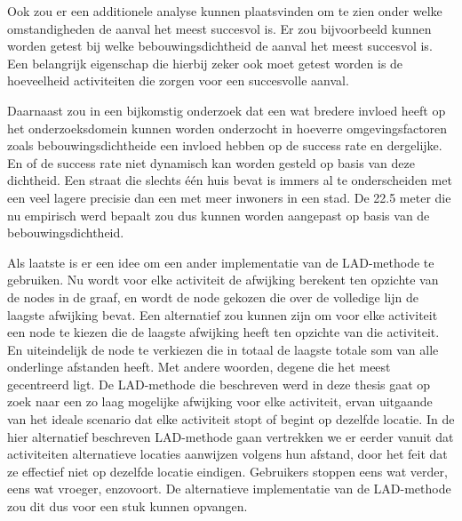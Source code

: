 Ook zou er een additionele analyse kunnen plaatsvinden om te zien onder welke
omstandigheden de aanval het meest succesvol is. Er zou bijvoorbeeld kunnen
worden getest bij welke bebouwingsdichtheid de aanval het meest succesvol is.
Een belangrijk eigenschap die hierbij zeker ook moet getest worden is de
hoeveelheid activiteiten die zorgen voor een succesvolle aanval.

Daarnaast zou in een bijkomstig onderzoek dat een wat bredere invloed heeft op
het onderzoeksdomein kunnen worden onderzocht in hoeverre omgevingsfactoren
zoals bebouwingsdichtheide een invloed hebben op de success rate en dergelijke.
En of de success rate niet dynamisch kan worden gesteld op basis van deze
dichtheid. Een straat die slechts één huis bevat is immers al te onderscheiden
met een veel lagere precisie dan een met meer inwoners in een stad. De 22.5
meter die nu empirisch werd bepaalt zou dus kunnen worden aangepast op basis
van de bebouwingsdichtheid.

Als laatste is er een idee om een ander implementatie van de \ac{LAD}-methode
te gebruiken. Nu wordt voor elke activiteit de afwijking berekent ten opzichte
van de nodes in de graaf, en wordt de node gekozen die over de volledige lijn
de laagste afwijking bevat. Een alternatief zou kunnen zijn om voor elke
activiteit een node te kiezen die de laagste afwijking heeft ten opzichte van
die activiteit. En uiteindelijk de node te verkiezen die in totaal de laagste
totale som van alle onderlinge afstanden heeft. Met andere woorden, degene die
het meest gecentreerd ligt. De \ac{LAD}-methode die beschreven werd in deze
thesis gaat op zoek naar een zo laag mogelijke afwijking voor elke activiteit,
ervan uitgaande van het ideale scenario dat elke activiteit stopt of begint op
dezelfde locatie. In de hier alternatief beschreven \ac{LAD}-methode gaan
vertrekken we er eerder vanuit dat activiteiten alternatieve locaties aanwijzen
volgens hun afstand, door het feit dat ze effectief niet op dezelfde locatie
eindigen. Gebruikers stoppen eens wat verder, eens wat vroeger, enzovoort. De
alternatieve implementatie van de \ac{LAD}-methode zou dit dus voor een stuk
kunnen opvangen.



